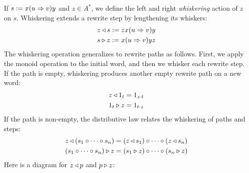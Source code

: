 \documentclass[../generics]{subfiles}
\begin{document}
\begin{definition}
If $s:=x(u\Rightarrow v)y$ and $z\in A^*$, we define the \index{$\WL$}left and \index{$\WR$}right \emph{whiskering} action of $z$ on $s$. Whiskering extends a rewrite step by lengthening its whiskers:
\begin{gather*}
z\triangleleft s := zx(u\Rightarrow v)y\\
s\triangleright z := x(u\Rightarrow v)yz
\end{gather*}
The whiskering operation generalizes to rewrite paths as follows. First, we apply the monoid operation to the initial word, and then we whisker each rewrite step. If the path is empty, whiskering produces another empty rewrite path on a new word:
\begin{gather*}
z\triangleleft 1_t = 1_{z\cdot t}\\
1_t\triangleright z = 1_{t\cdot z}
\end{gather*}
If the path is non-empty, the distributive law relates the whiskering of paths and steps:
\begin{gather*}
z\triangleleft (s_1\circ\cdots\circ s_n) = (z\triangleleft s_1)\circ\cdots\circ (z\triangleleft s_n)\\
(s_1\circ\cdots\circ s_n)\triangleright z = (s_1\triangleright z)\circ\cdots\circ (s_n\triangleright z)
\end{gather*}
Here is a diagram for $z\triangleleft p$ and $p\triangleright z$:
\begin{center}
\end{center}


\end{definition}
\end{document}
